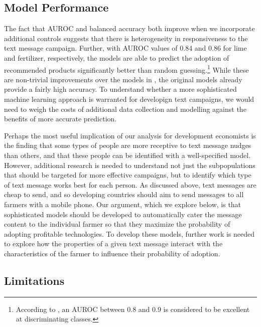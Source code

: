 \documentclass[12pt]{article}
\begin{document}
\subsection{Model Performance}
The fact that AUROC and balanced accuracy both improve when we incorporate additional controls suggests that there is heterogeneity in responsiveness to the text message campaign. Further, with AUROC values of 0.84 and 0.86 for lime and fertilizer, respectively, the models are able to predict the adoption of recommended products significantly better than random guessing.\footnote{According to \textcite{mandrekar_receiver_2010}, an AUROC between 0.8 and 0.9 is considered to be excellent at discriminating classes.} While these are non-trivial improvements over the models in \textcite{fabregas_digital_2025}, the original models already provide a fairly high accuracy. To understand whether a more sophisticated machine learning approach is warranted for developign text campaigns, we would need to weigh the costs of additional data collection and modelling against the benefits of more accurate prediction.

Perhaps the most useful implication of our analysis for development economists is the finding that some types of people are more receptive to text message nudges than others, and that these people can be identified with a well-specified model. However, additional research is needed to understand not just the subpopulations that should be targeted for more effective campaigns, but to identify which type of text message works best for each person. As discussed above, text messages are cheap to send, and so developing countries should aim to send messages to all farmers with a mobile phone. Our argument, which we explore below, is that sophisticated models should be developed to automatically cater the message content to the individual farmer so that they maximize the probability of adopting profitable technologies. To develop these models, further work is needed to explore how the properties of a given text message interact with the characteristics of the farmer to influence their probability of adoption.

\subsection{Limitations}
\end{document}
